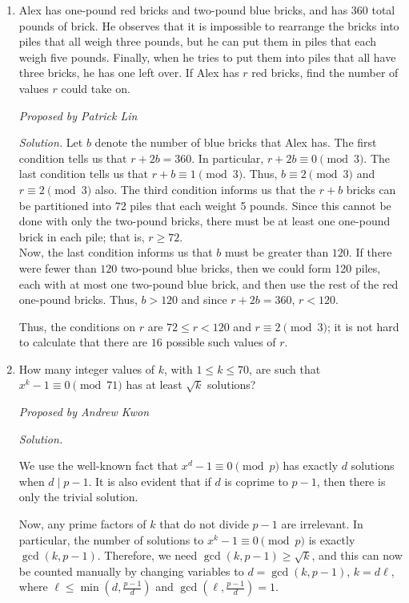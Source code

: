 \documentclass[10pt]{article}
\newcommand{\proposed}[1]
{
\vspace{3pt}
\noindent\textit{Proposed by #1}
}
\newcommand{\solution}
{
\vspace{3pt}
\noindent\textit{Solution.}\qquad
}
\begin{document}
\begin{enumerate}
\item  Alex has one-pound red bricks and two-pound blue bricks, and has 360 total pounds of brick. He observes that it is impossible to rearrange the bricks into piles that all weigh three pounds, but he can put them in piles that each weigh five pounds. Finally, when he tries to put them into piles that all have three bricks, he has one left over. If Alex has $r$ red bricks, find the number of values $r$ could take on.

\proposed{Patrick Lin}

\solution Let $b$ denote the number of blue bricks that Alex has. The first condition tells us that $r + 2b = 360$. In particular, $r + 2b \equiv 0 \pmod{3}$. The last condition tells us that $r + b \equiv 1 \pmod{3}$. Thus, $b \equiv 2 \pmod{3}$ and $r \equiv 2 \pmod{3}$ also. The third condition informs us that the $r + b$ bricks can be partitioned into 72 piles that each weight 5 pounds. Since this cannot be done with only the two-pound bricks, there must be at least one one-pound brick in each pile; that is, $r \geq 72$.\\ 

Now, the last condition informs us that $b$ must be greater than $120$. If there were fewer than $120$ two-pound blue bricks, then we could form 120 piles, each with at most one two-pound blue brick, and then use the rest of the red one-pound bricks. Thus, $b > 120$ and since $r + 2b = 360$, $r< 120$. 

Thus, the conditions on $r$ are $72\leq r < 120$ and $r\equiv 2\pmod 3$; it is not hard to calculate that there are $\boxed{16}$ possible such values of $r$.

\item How many integer values of $k$, with $1 \leq k \leq 70$, are such that $x^{k}-1 \equiv 0 \pmod{71}$ has at least $\sqrt{k}$ solutions?

\proposed{Andrew Kwon}

\solution
We use the well-known fact that $x^{d} - 1 \equiv 0 \pmod{p}$ has exactly $d$ solutions when $d \mid p - 1$. It is also evident that if $d$ is coprime to $p-1$, then there is only the trivial solution.

\par Now, any prime factors of $k$ that do not divide $p-1$ are irrelevant. In particular, the number of solutions to $x^{k} - 1 \equiv 0 \pmod{p}$ is exactly $\gcd(k, p - 1)$. Therefore, we need $\gcd(k, p - 1) \geq \sqrt{k}$, and this can now be counted manually by changing variables to $d = \gcd(k, p - 1)$, $k = d \ell$, where $\ell \leq \min(d, \frac{p-1}{d})$ and $\gcd(\ell, \tfrac{p-1}{d}) = 1$.


\end{enumerate}
\end{document}
